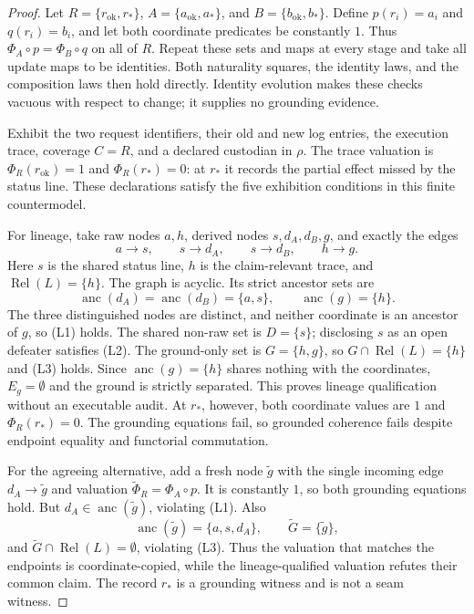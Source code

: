 \documentclass[11pt]{article}
\theoremstyle{definition}
\begin{document}
\begin{proof}
Let $R=\{r_{\mathrm{ok}},r_*\}$, $A=\{a_{\mathrm{ok}},a_*\}$, and $B=\{b_{\mathrm{ok}},b_*\}$. Define $p(r_i)=a_i$ and $q(r_i)=b_i$, and let both coordinate predicates be constantly $1$. Thus $\Phi_A\circ p=\Phi_B\circ q$ on all of $R$. Repeat these sets and maps at every stage and take all update maps to be identities. Both naturality squares, the identity laws, and the composition laws then hold directly. Identity evolution makes these checks vacuous with respect to change; it supplies no grounding evidence.

Exhibit the two request identifiers, their old and new log entries, the execution trace, coverage $C=R$, and a declared custodian in $\rho$. The trace valuation is $\Phi_R(r_{\mathrm{ok}})=1$ and $\Phi_R(r_*)=0$: at $r_*$ it records the partial effect missed by the status line. These declarations satisfy the five exhibition conditions in this finite countermodel.

For lineage, take raw nodes $a,h$, derived nodes $s,d_A,d_B,g$, and exactly the edges
\[
a\to s,\qquad s\to d_A,\qquad s\to d_B,\qquad h\to g.
\]
Here $s$ is the shared status line, $h$ is the claim-relevant trace, and $\operatorname{Rel}(L)=\{h\}$. The graph is acyclic. Its strict ancestor sets are
\[
\operatorname{anc}(d_A)=\operatorname{anc}(d_B)=\{a,s\},
\qquad \operatorname{anc}(g)=\{h\}.
\]
The three distinguished nodes are distinct, and neither coordinate is an ancestor of $g$, so (L1) holds. The shared non-raw set is $D=\{s\}$; disclosing $s$ as an open defeater satisfies (L2). The ground-only set is $G=\{h,g\}$, so $G\cap\operatorname{Rel}(L)=\{h\}$ and (L3) holds. Since $\operatorname{anc}(g)=\{h\}$ shares nothing with the coordinates, $E_g=\emptyset$ and the ground is strictly separated. This proves lineage qualification without an executable audit. At $r_*$, however, both coordinate values are $1$ and $\Phi_R(r_*)=0$. The grounding equations fail, so grounded coherence fails despite endpoint equality and functorial commutation.

For the agreeing alternative, add a fresh node $\widetilde g$ with the single incoming edge $d_A\to\widetilde g$ and valuation $\widetilde\Phi_R=\Phi_A\circ p$. It is constantly $1$, so both grounding equations hold. But $d_A\in\operatorname{anc}(\widetilde g)$, violating (L1). Also
\[
\operatorname{anc}(\widetilde g)=\{a,s,d_A\},
\qquad \widetilde G=\{\widetilde g\},
\]
and $\widetilde G\cap\operatorname{Rel}(L)=\emptyset$, violating (L3). Thus the valuation that matches the endpoints is coordinate-copied, while the lineage-qualified valuation refutes their common claim. The record $r_*$ is a grounding witness and is not a seam witness.
\end{proof}
\end{document}
